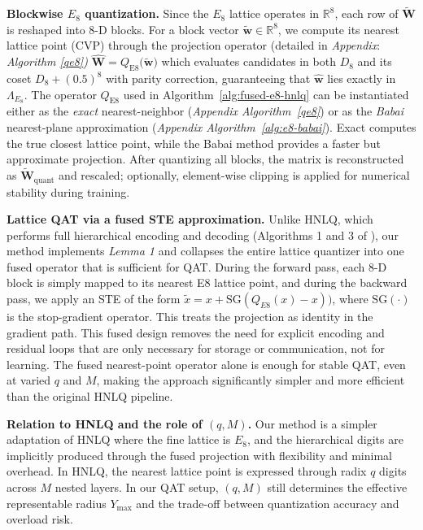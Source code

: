 \documentclass{article}
\theoremstyle{definition}
\theoremstyle{remark}
\begin{document}
\noindent \textbf{Blockwise $E_8$ quantization.} Since the $E_8$ lattice operates in $\mathbb{R}^8$, each row of $\widetilde{\mathbf{W}}$ is reshaped into 8-D blocks. For a block vector $\widetilde{\mathbf{w}} \in \mathbb{R}^8$, we compute its nearest lattice point (CVP) through the projection operator (detailed in \textit{Appendix}: \textit{Algorithm \ref{qe8})} $ \widehat{\mathbf{W}}= Q_{\mathrm{E8}}\bigl(
    \widetilde{\mathbf{w}}
  \bigr)$
which evaluates candidates in both $D_8$ and its coset $D_8 + (0.5)^8$ with parity correction, guaranteeing that $\widehat{\mathbf{w}}$ lies exactly in $\Lambda_{E_8}$. The operator $Q_{\mathrm{E8}}$ used in Algorithm~\ref{alg:fused-e8-hnlq} can be instantiated either as the \emph{exact} nearest-neighbor (\textit{Appendix Algorithm~\ref{qe8}}) or as the \emph{Babai} nearest-plane approximation (\textit{Appendix Algorithm~\ref{alg:e8-babai}}). Exact computes the true closest lattice point, while the Babai method provides a faster but approximate projection. After quantizing all blocks, the matrix is reconstructed as $\widetilde{\mathbf{W}}_{\mathrm{quant}}$ and rescaled; optionally, element-wise clipping is applied for numerical stability during training.

\noindent \textbf{Lattice QAT via a fused STE approximation.} Unlike HNLQ, which performs full hierarchical encoding and decoding (Algorithms 1 and 3 of \cite{hnlq}), our method implements \textit{Lemma 1} \cite{hnlq} and collapses the entire lattice quantizer into one fused operator that is sufficient for QAT. During the forward pass, each 8-D block is simply mapped to its nearest E8 lattice point, and during the backward pass, we apply an STE of the form $\tilde{x} = x +\mathrm{SG}(Q_{E8}(x) -x))$, where $\mathrm{SG}(\cdot)$ is the stop-gradient operator. This treats the projection as identity in the gradient path. This fused design removes the need for explicit encoding and residual loops that are only necessary for storage or communication, not for learning. The fused nearest-point operator alone is enough for stable QAT, even at varied $q$ and $M$, making the approach significantly simpler and more efficient than the original HNLQ pipeline.

\noindent \textbf{Relation to HNLQ and the role of $(q,M)$.}
Our method is a simpler adaptation of HNLQ where the fine lattice is $E_8$, and the hierarchical digits are implicitly produced through the fused projection with flexibility and minimal overhead. In HNLQ, the nearest lattice point is expressed through radix $q$ digits across $M$ nested layers. In our QAT setup, $(q,M)$ still determines the effective representable radius $Y_{\max}$ and the trade-off between quantization accuracy and overload risk.
\end{document}
